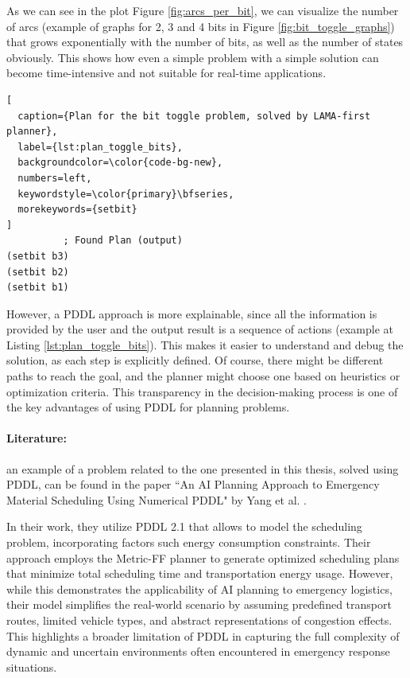 As we can see in the plot Figure \ref{fig:arcs_per_bit}, we can visualize the number
of arcs (example of graphs for 2, 3 and 4 bits in Figure \ref{fig:bit_toggle_graphs})
that grows exponentially with the number of bits, as well as the number of states
obviously. This shows how even a simple problem with a simple solution can
become time-intensive and not suitable for real-time applications.

\begin{lstlisting}[
  caption={Plan for the bit toggle problem, solved by LAMA-first planner},
  label={lst:plan_toggle_bits},
  backgroundcolor=\color{code-bg-new},
  numbers=left,
  keywordstyle=\color{primary}\bfseries,
  morekeywords={setbit}
]
          ; Found Plan (output)
(setbit b3)
(setbit b2)
(setbit b1)
\end{lstlisting}

However, a PDDL approach is more explainable, since all the information is provided
by the user and the output result is a sequence of actions (example at Listing
\ref{lst:plan_toggle_bits}). This makes it easier to understand and debug the
solution, as each step is explicitly defined. Of course, there might be different
paths to reach the goal, and the planner might choose one based on heuristics or
optimization criteria. This transparency in the decision-making process is one of
the key advantages of using PDDL for planning problems.

\paragraph{Literature:}
an example of a problem related to the one presented in this thesis, solved using
PDDL, can be found in the paper ``An AI Planning Approach to Emergency Material
Scheduling Using Numerical PDDL" by Yang et al. \cite{Yang2022}.

In their work, they utilize PDDL 2.1 that allows to model the scheduling problem,
incorporating factors such energy consumption constraints. Their approach employs
the Metric-FF planner to generate optimized scheduling plans that minimize total
scheduling time and transportation energy usage. However, while this demonstrates
the applicability of AI planning to emergency logistics, their model simplifies
the real-world scenario by assuming predefined transport routes, limited vehicle
types, and abstract representations of congestion effects. This highlights a broader
limitation of PDDL in capturing the full complexity of dynamic and uncertain environments
often encountered in emergency response situations.

